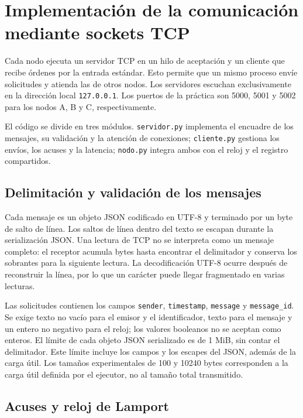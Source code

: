 \documentclass[11pt,a4paper]{article}
\begin{document}
\section{Implementación de la comunicación mediante sockets TCP}
\label{sec:sockets}

Cada nodo ejecuta un servidor TCP en un hilo de aceptación y un cliente que
recibe órdenes por la entrada estándar. Esto permite que un mismo proceso
envíe solicitudes y atienda las de otros nodos. Los servidores escuchan
exclusivamente en la dirección local \texttt{127.0.0.1}. Los puertos de la
práctica son 5000, 5001 y 5002 para los nodos A, B y C, respectivamente.

El código se divide en tres módulos. \texttt{servidor.py} implementa el
encuadre de los mensajes, su validación y la atención de conexiones;
\texttt{cliente.py} gestiona los envíos, los acuses y la latencia;
\texttt{nodo.py} integra ambos con el reloj y el registro compartidos.

\subsection{Delimitación y validación de los mensajes}

Cada mensaje es un objeto JSON codificado en UTF-8 y terminado por un byte
de salto de línea. Los saltos de línea dentro del texto se escapan durante
la serialización JSON. Una lectura de TCP no se interpreta como un mensaje
completo: el receptor acumula bytes hasta encontrar el delimitador y
conserva los sobrantes para la siguiente lectura. La decodificación UTF-8
ocurre después de reconstruir la línea, por lo que un carácter puede llegar
fragmentado en varias lecturas.

Las solicitudes contienen los campos \texttt{sender}, \texttt{timestamp},
\texttt{message} y \texttt{message\_id}. Se exige texto no vacío para el
emisor y el identificador, texto para el mensaje y un entero no negativo
para el reloj; los valores booleanos no se aceptan como enteros. El límite
de cada objeto JSON serializado es de 1 MiB, sin contar el delimitador.
Este límite incluye los campos y los escapes del JSON, además de la carga
útil. Los tamaños experimentales de 100 y 10240 bytes corresponden a la
carga útil definida por el ejecutor, no al tamaño total transmitido.

\subsection{Acuses y reloj de Lamport}
\end{document}
